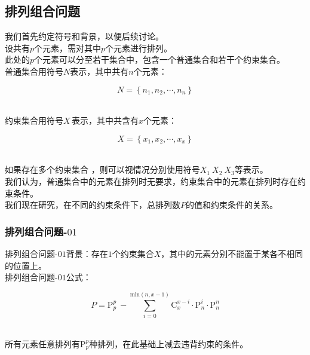 \documentclass[UTF8]{ctexart}
\newcommand{\rnum}[1]{\uppercase\expandafter{\romannumeral #1\relax}}
\begin{document}
\newpage

\subsection{排列组合问题\rnum{1}}
    我们首先约定符号和背景，以便后续讨论。\\[3mm]
    设共有$p$个元素，需对其中$p$个元素进行排列。\\[3mm]
    此处的$p$个元素可以分至若干集合中，包含一个普通集合和若干个约束集合。\\[3mm]
    普通集合用符号$N$表示，其中共有$n$个元素：
    \begin{large}
        \begin{equation*}
            N=\left\{n_1,n_2,\cdots,n_n\right\}
        \end{equation*}
    \end{large}\\
    约束集合用符号$X\,$表示，其中共含有$x$个元素：
    \begin{large}
        \begin{equation*}
            X=\left\{x_1,x_2,\cdots,x_x\right\}
        \end{equation*}
    \end{large}\\
    如果存在多个约束集合 ，则可以视情况分别使用符号$X_1~X_2~X_3$等表示。\\[3mm]
    我们认为，普通集合中的元素在排列时无要求，约束集合中的元素在排列时存在约束条件。\\[3mm]
    我们现在研究，在不同的约束条件下，总排列数$P$的值和约束条件的关系。\\

\subsubsection{排列组合问题\rnum{1}-$01$}
    排列组合问题\rnum{1}-$01$背景：存在$1$个约束集合$X$，其中的元素分别不能置于某各不相同的位置上。\\[3mm]
    排列组合问题\rnum{1}-$01$公式：
    \begin{large}
        \begin{equation*}
            P=\mathrm{P}_p^p~-\sum_{i=0}^{\mathrm{min}(n,x-1)}\mathrm{C}_x^{x-i}\cdot\mathrm{P}_n^i\cdot\mathrm{P}_n^n
        \end{equation*}
    \end{large}\\
    所有元素任意排列有$\mathrm{P}_p^p$种排列，在此基础上减去违背约束的条件。
\end{document}
